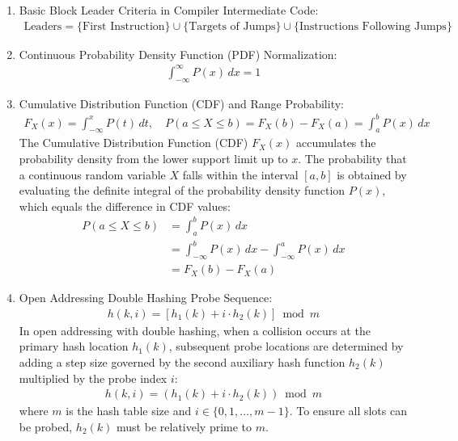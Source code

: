 \begin{enumerate}[label=\thesubsection.\arabic*, ref=\thesubsection.\theenumi, itemsep=0.5cm]
\item Basic Block Leader Criteria in Compiler Intermediate Code:
\begin{align}
\text{Leaders} = \{\text{First Instruction}\} \cup \{\text{Targets of Jumps}\} \cup \{\text{Instructions Following Jumps}\} \label{eq:CS12025-basic_block_leaders}
\end{align}

\item Continuous Probability Density Function (PDF) Normalization:
\begin{align}
\int_{-\infty}^{\infty} P(x) \, dx = 1 \label{eq:CS12025-pdf_normalization}
\end{align}

\item Cumulative Distribution Function (CDF) and Range Probability:
\begin{align}
F_X(x) = \int_{-\infty}^x P(t) \, dt, \quad P(a \le X \le b) = F_X(b) - F_X(a) = \int_a^b P(x) \, dx \label{eq:CS12025-cdf_range_probability}
\end{align}
\solution
The Cumulative Distribution Function (CDF) $F_X(x)$ accumulates the probability density from the lower support limit up to $x$. The probability that a continuous random variable $X$ falls within the interval $[a, b]$ is obtained by evaluating the definite integral of the probability density function $P(x)$, which equals the difference in CDF values:
\begin{align}
P(a \le X \le b) &= \int_a^b P(x) \, dx \\
                 &= \int_{-\infty}^b P(x) \, dx - \int_{-\infty}^a P(x) \, dx \\
                 &= F_X(b) - F_X(a)
\end{align}

\item Open Addressing Double Hashing Probe Sequence:
\begin{align}
h(k, i) = \left[ h_1(k) + i \cdot h_2(k) \right] \bmod m \label{eq:CS12025-double_hashing}
\end{align}
\solution
In open addressing with double hashing, when a collision occurs at the primary hash location $h_1(k)$, subsequent probe locations are determined by adding a step size governed by the second auxiliary hash function $h_2(k)$ multiplied by the probe index $i$:
\begin{align}
h(k, i) = \left( h_1(k) + i \cdot h_2(k) \right) \bmod m
\end{align}
where $m$ is the hash table size and $i \in \{0, 1, \dots, m-1\}$. To ensure all slots can be probed, $h_2(k)$ must be relatively prime to $m$.

\end{enumerate}
